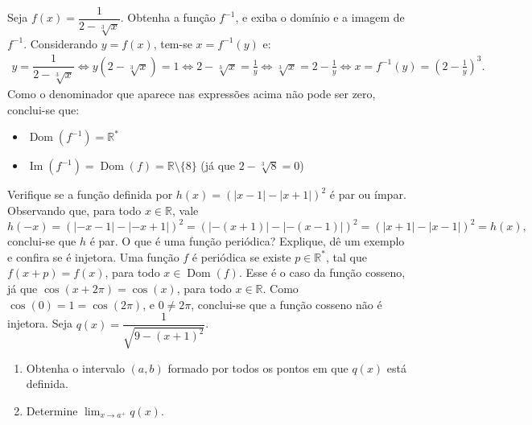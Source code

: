 \documentclass[12pt,a4paper]{article}
\newcommand*\dom[1]{\operatorname{Dom}\left(#1\right)}
\newcommand*\im[1]{\operatorname{Im}\left(#1\right)}
\newcommand*\R{\mathbb{R}}
\begin{document}
\begin{ExerciseList}
\Exercise[title={2,0}] Seja $f(x) = \dfrac{1}{2-\sqrt[3]{x}}$. Obtenha a função $f^{-1}$, e exiba o domínio e a imagem de $f^{-1}$.
\Answer Considerando $y = f(x)$, tem-se $x = f^{-1}(y)$ e:
\begin{align*}
y = \dfrac{1}{2-\sqrt[3]{x}}
\Leftrightarrow y(2-\sqrt[3]{x}) = 1
\Leftrightarrow 2-\sqrt[3]{x} = \frac{1}{y}
\Leftrightarrow \sqrt[3]{x} = 2-\frac{1}{y}
\Leftrightarrow x = f^{-1}(y) = \left(2-\frac{1}{y}\right)^3.
\end{align*}
Como o denominador que aparece nas expressões acima não pode ser zero, conclui-se que:
\begin{itemize}
\item $\dom{f^{-1}} = \R^*$
\item $\im{f^{-1}} = \dom{f} = \R \setminus \{8\}$ (já que $2-\sqrt[3]{8} = 0$)
\end{itemize}
\Exercise[title={2,0}] Verifique se a função definida por $h(x) = (|x - 1| - |x + 1|)^2$ é par ou ímpar.
\Answer Observando que, para todo $x\in \R$, vale
\[
h(-x) = (|-x - 1| - |-x + 1|)^2
      = (|-(x + 1)| - |-(x - 1)|)^2
      = (|x + 1| - |x - 1|)^2
      = h(x),
\]
conclui-se que $h$ é par.
\Exercise[title={2,0}] O que é uma função periódica? Explique, dê um exemplo e confira se é injetora.
\Answer Uma função $f$ é periódica se existe $p \in \R^*$, tal que $f(x+p) = f(x)$, para todo $x \in \dom{f}$. Esse é o caso da função cosseno, já que $\cos(x + 2\pi) = \cos(x)$, para todo $x \in \R$. Como $\cos(0) = 1 = \cos(2\pi)$, e $0 \neq 2\pi$, conclui-se que a função cosseno não é injetora.
\Exercise[title={2,0}] Seja $q(x) = \dfrac{1}{\sqrt{9 - (x + 1)^2}}$.
\begin{enumerate}
\item Obtenha o intervalo $(a, b)$ formado por todos os pontos em que $q(x)$ está definida.
\item Determine $\displaystyle\lim_{x\to a^{+}} q(x)$.
\end{enumerate}


\end{ExerciseList}
\end{document}
